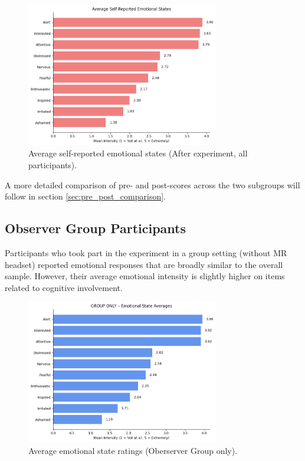 \begin{figure}[htbp]
    \centering
    \includegraphics[width=0.75\textwidth]{../../Figures/emotional-post-all.png}
    \caption{Average self-reported emotional states (After experiment, all participants).}
    \label{fig:emotional_post_all}
\end{figure}

A more detailed comparison of pre- and post-scores across the two subgroups will follow in section \ref{sec:pre_post_comparison}.

\subsection{Observer Group Participants}

Participants who took part in the experiment in a group setting (without MR headset) reported emotional responses that are broadly similar to the overall sample. However, their average emotional intensity is slightly higher on items related to cognitive involvement.

\begin{figure}[htbp]
    \centering
    \includegraphics[width=0.75\textwidth]{../../Figures/emotional-post-grp.png}
    \caption{Average emotional state ratings (Oberserver Group only).}
    \label{fig:emotional_post_group}
\end{figure}

